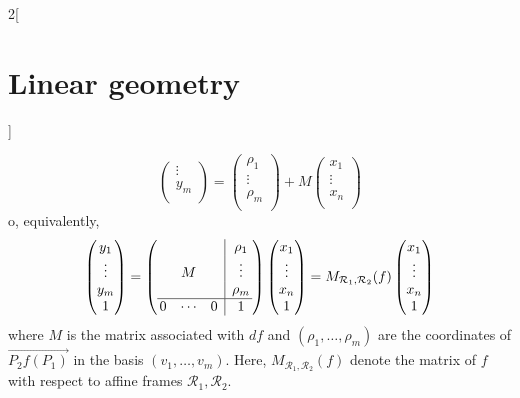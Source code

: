 \documentclass[class=article,10pt,crop=false]{standalone}
\begin{document}
\begin{multicols}{2}[\section{Linear geometry}]
\begin{prop}
$$\begin{pmatrix}
\vdots \\
y_m \\
\end{pmatrix}=\begin{pmatrix}
\rho_1 \\
\vdots \\
\rho_m \\
\end{pmatrix}+M\begin{pmatrix}
x_1 \\
\vdots \\
x_n \\
\end{pmatrix}$$
o, equivalently,
$$\begin{pmatrix}
y_1 \\
\vdots \\
y_m \\
1 \\
\end{pmatrix}=\left(\begin{array}{@{\,}ccc|c@{\,}}
    & & &\rho_1\\
    & M & & \vdots\\
    & & & \rho_m\\
    \hline
    0 & \cdots & 0 &  1
\end{array}\right)\begin{pmatrix}
x_1 \\
\vdots \\
x_n \\
1 \\
\end{pmatrix}=M_{\mathcal{R}_1,\mathcal{R}_2}(f)\begin{pmatrix}
x_1 \\
\vdots \\
x_n \\
1 \\
\end{pmatrix}$$ where $M$ is the matrix associated with $df$ and $(\rho_1,\ldots,\rho_m)$ are the coordinates of $\overrightarrow{P_2f(P_1)}$ in the basis $(v_1,\ldots,v_m)$. Here, $M_{\mathcal{R}_1,\mathcal{R}_2}(f)$ denote the matrix of $f$ with respect to affine frames $\mathcal{R}_1,\mathcal{R}_2$.
\end{prop}

\end{multicols}
\end{document}
